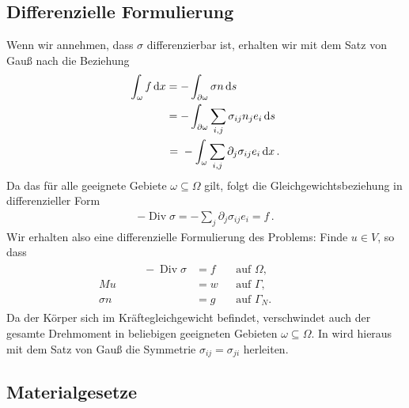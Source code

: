 \documentclass{scrartcl}
\newcommand{\tikzmark}[3][]{\tikz[remember picture,baseline] \node [anchor=base,#1](#2) {$#3$};}
\newcommand{\dif}[1]{\,\mathrm{d} #1}
\DeclareMathOperator{\diver}{Div}			%
\begin{document}
\subsection{Differenzielle Formulierung}

Wenn wir annehmen, dass $\sigma$ differenzierbar ist, erhalten wir mit dem Satz von Gauß nach \cite[S.5]{Lif-1959} die Beziehung
\begin{align*}
	\int_\omega f\dif x &=  -\int_{\partial\omega}\sigma n\dif s \\
	&= -\int_{\partial\omega}\sum_{i,j}\sigma_{ij}n_je_i\dif s \\
	&\tikzmark{gaussglw}{=} -\int_{\omega}\sum_{i,j}\partial_j\sigma_{ij}e_i\dif x\,.
\end{align*}
Da das für alle geeignete Gebiete $\omega\subseteq\Omega$ gilt, folgt die Gleichgewichtsbeziehung in differenzieller Form
\begin{align*}
	-\diver\sigma = -\sum_j\partial_j\sigma_{ij}e_i=f\,.
\end{align*}
Wir erhalten also eine differenzielle Formulierung des Problems: Finde $u\in V$, so dass
\begin{align}
	\begin{aligned}
	\qquad\qquad-\diver\sigma &= f &&\text{auf }\Omega,\qquad\qquad\\
	Mu &= w &&\text{auf }\Gamma, \\
	\sigma n &= g &&\text{auf }\Gamma_N.
	\end{aligned}
	\label{eq:differenzielleFormulierung}
\end{align}
Da der Körper sich im Kräftegleichgewicht befindet, verschwindet auch der gesamte Drehmoment in beliebigen geeigneten Gebieten $\omega\subseteq\Omega$. In \cite[S.5f.]{Lif-1959} wird hieraus mit dem Satz von Gauß die Symmetrie $\sigma_{ij}=\sigma_{ji}$ herleiten.


\subsection{Materialgesetze}
\end{document}
